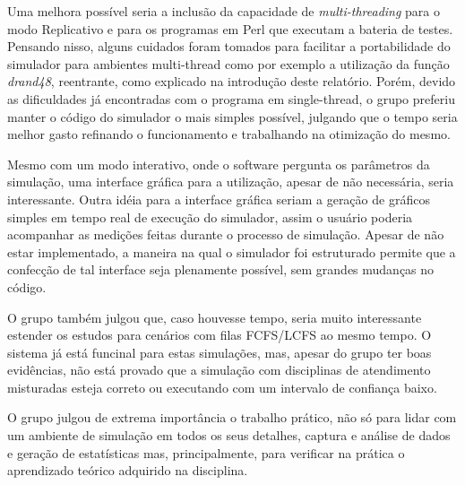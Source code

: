 \documentclass[a4paper,10pt]{article}
\begin{document}
    Uma melhora possível seria a inclusão da capacidade de \emph{multi-threading} para o modo Replicativo e para os programas em Perl que executam a bateria de testes. Pensando nisso, alguns cuidados foram tomados para facilitar a portabilidade do simulador para ambientes multi-thread como por exemplo a utilização da função \emph{drand48}, reentrante, como explicado na introdução deste relatório. Porém, devido as dificuldades já encontradas com o programa em single-thread, o grupo preferiu manter o código do simulador o mais simples possível, julgando que o tempo seria melhor gasto refinando o funcionamento e trabalhando na otimização do mesmo.

    Mesmo com um modo interativo, onde o software pergunta os parâmetros da simulação, uma interface gráfica para a utilização, apesar de não necessária, seria interessante. Outra idéia para a interface gráfica seriam a geração de gráficos simples em tempo real de execução do simulador, assim o usuário poderia acompanhar as medições feitas durante o processo de simulação. Apesar de não estar implementado, a maneira na qual o simulador foi estruturado permite que a confecção de tal interface seja plenamente possível, sem grandes mudanças no código.

    O grupo também julgou que, caso houvesse tempo, seria muito interessante estender os estudos para cenários com filas FCFS/LCFS ao mesmo tempo. O sistema já está funcinal para estas simulações, mas, apesar do grupo ter boas evidências, não está provado que a simulação com disciplinas de atendimento misturadas esteja correto ou executando com um intervalo de confiança baixo.

    O grupo julgou de extrema importância o trabalho prático, não só para lidar com um ambiente de simulação em todos os seus detalhes, captura e análise de dados e geração de estatísticas mas, principalmente, para verificar na prática o aprendizado teórico adquirido na disciplina.
\pagebreak
\end{document}
